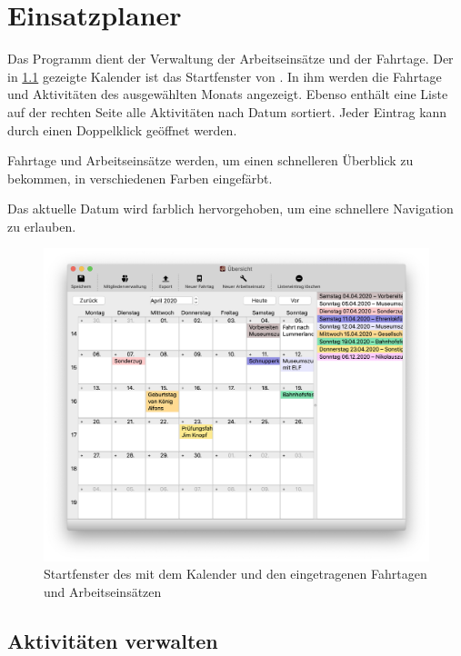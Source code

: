 \chapter{Einsatzplaner}\label{einsatz:kalender}
Das Programm \Einsatz dient der Verwaltung der Arbeitseinsätze und der Fahrtage.
Der in \cref{fig:einsatz:kalender} gezeigte Kalender ist das Startfenster von \Einsatz.
In ihm werden die Fahrtage und Aktivitäten des ausgewählten Monats angezeigt.
Ebenso enthält eine Liste auf der rechten Seite alle Aktivitäten nach Datum sortiert.
Jeder Eintrag kann durch einen Doppelklick geöffnet werden.


Fahrtage und Arbeitseinsätze werden,
um einen schnelleren Überblick zu bekommen,
in verschiedenen Farben eingefärbt.
\begin{neu}
Das aktuelle Datum wird farblich hervorgehoben,
um eine schnellere Navigation zu erlauben.
\end{neu}

\begin{figure}[h]
  \includegraphics[width=\textwidth]{img/kalender}
  \caption{
  Startfenster des \Einsatz mit dem Kalender und den eingetragenen Fahrtagen und Arbeitseinsätzen}
  \label{fig:einsatz:kalender}
\end{figure}



\section{Aktivitäten verwalten}
\label{einsatz:kalender:anlegen}
\label{einsatz:kalender:löschen}
